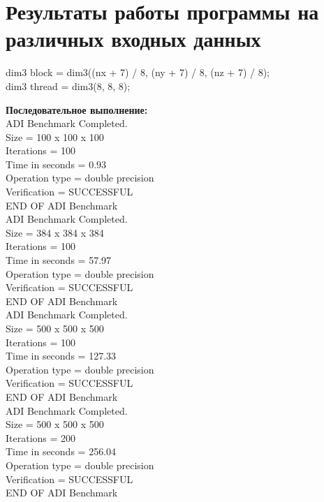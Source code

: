 \documentclass[a4paper,12pt,titlepage,draft]{article}
\begin{document}
\section{Результаты работы программы на различных входных данных}
\begin{center}
    dim3 block = dim3((nx + 7) / 8, (ny + 7) / 8, (nz + 7) / 8);\\
    dim3 thread = dim3(8, 8, 8);\\
\end{center}
\begin{minipage}{.5\textwidth}
\textbf{Последовательное выполнение:}\\

 ADI Benchmark Completed.\\
 Size            =  100 x  100 x  100\\
 Iterations      =                100\\
 Time in seconds =               0.93\\
 Operation type  =   double precision\\
 Verification    =         SUCCESSFUL\\
 END OF ADI Benchmark\\
 
 ADI Benchmark Completed.\\
 Size            =  384 x  384 x  384\\
 Iterations      =                100\\
 Time in seconds =              57.97\\
 Operation type  =   double precision\\
 Verification    =         SUCCESSFUL\\
 END OF ADI Benchmark\\

 ADI Benchmark Completed.\\
 Size            =  500 x  500 x  500\\
 Iterations      =                100\\
 Time in seconds =             127.33\\
 Operation type  =   double precision\\
 Verification    =         SUCCESSFUL\\
 END OF ADI Benchmark\\

 ADI Benchmark Completed.\\
 Size            =  500 x  500 x  500\\
 Iterations      =                200\\
 Time in seconds =             256.04\\
 Operation type  =   double precision\\
 Verification    =         SUCCESSFUL\\
 END OF ADI Benchmark\\
 
\end{minipage}
\end{document}
